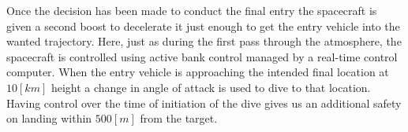 Once the decision has been made to conduct the final entry the spacecraft is given a second boost to decelerate it just enough to get the entry vehicle into the wanted trajectory. Here, just as during the first pass through the atmosphere, the spacecraft is controlled using active bank control managed by a real-time control computer. When the entry vehicle is approaching the intended final location at $10 \left[km\right]$ height a change in angle of attack is used to dive to that location. Having control over the time of initiation of the dive gives us an additional safety on landing within  $500 \left[m\right]$ from the target.